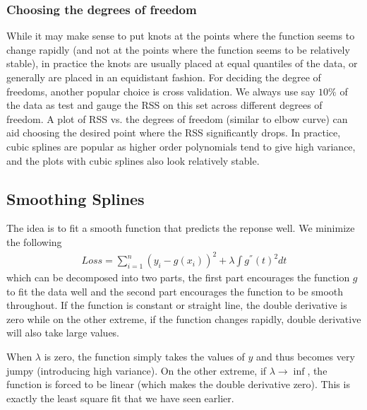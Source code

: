 \documentclass[11pt, a4paper]{article}
\begin{document}
    \subsubsection{Choosing the degrees of freedom}
    While it may make sense to put knots at the points where the function seems to change rapidly (and not at the points where the function seems to be relatively stable), in practice the knots are usually placed at equal quantiles of the data, or generally are placed in an equidistant fashion.\newline
    For deciding the degree of freedoms, another popular choice is cross validation. We always use say $10\%$ of the data as test and gauge the RSS on this set across different degrees of freedom. A plot of RSS vs. the degrees of freedom (similar to elbow curve) can aid choosing the desired point where the RSS significantly drops.\newline
    In practice, cubic splines are popular as higher order polynomials tend to give high variance, and the plots with cubic splines also look relatively stable.


    \subsection{Smoothing Splines}
    The idea is to fit a smooth function that predicts the reponse well. We minimize the following
    \begin{align*}
        Loss = \sum_{i=1}^{n} (y_{i} - g(x_{i}))^{2} + \lambda \int g^{''}(t)^{2}dt \tag*{$\lambda > 0$}
    \end{align*}
    which can be decomposed into two parts, the first part encourages the function $g$ to fit the data well and the second part encourages the function to be smooth throughout.\newline
    If the function is constant or straight line, the double derivative is zero while on the other extreme, if the function changes rapidly, double derivative will also take large values.\newline

    When $\lambda$ is zero, the function simply takes the values of $y$ and thus becomes very jumpy (introducing high variance). On the other extreme, if $\lambda \to \inf$, the function is forced to be linear (which makes the double derivative zero). This is exactly the least square fit that we have seen earlier.\newline
\end{document}
